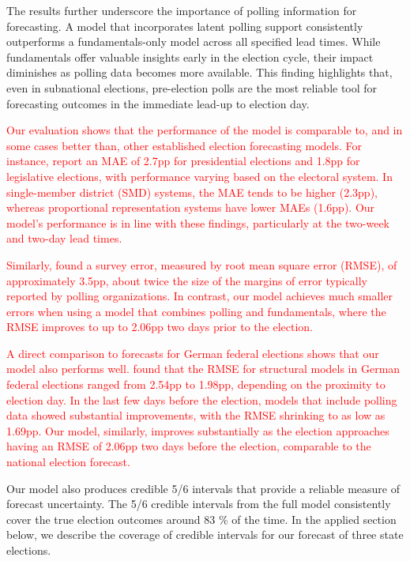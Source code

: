 \documentclass[doublespaced,12pt]{article}
\begin{document}
\begin{doublespacing}
The results further underscore the importance of polling information for forecasting. A model that incorporates latent polling support consistently outperforms a fundamentals-only model across all specified lead times. While fundamentals offer valuable insights early in the election cycle, their impact diminishes as polling data becomes more available. This finding highlights that, even in subnational elections, pre-election polls are the most reliable tool for forecasting outcomes in the immediate lead-up to election day.

\textcolor{red}{Our evaluation shows that the performance of the model is comparable to, and in some cases better than, other established election forecasting models. For instance, \citet{jennings2018election} report an MAE of 2.7pp for presidential elections and 1.8pp for legislative elections, with performance varying based on the electoral system. In single-member district (SMD) systems, the MAE tends to be higher (2.3pp), whereas proportional representation systems have lower MAEs (1.6pp). Our model's performance is in line with these findings, particularly at the two-week and two-day lead times.}

\textcolor{red}{Similarly, \citet{shirani2018disentangling} found a survey error, measured by root mean square error (RMSE), of approximately 3.5pp, about twice the size of the margins of error typically reported by polling organizations. In contrast, our model achieves much smaller errors when using a model that combines polling and fundamentals, where the RMSE improves to up to 2.06pp two days prior to the election.}

\textcolor{red}{A direct comparison to forecasts for German federal elections shows that our model also performs well. \citet{munzert_2017} found that the RMSE for structural models in German federal elections ranged from 2.54pp to 1.98pp, depending on the proximity to election day. In the last few days before the election, models that include polling data showed substantial improvements, with the RMSE shrinking to as low as 1.69pp. Our model, similarly, improves substantially as the election approaches having an RMSE of 2.06pp two days before the election, comparable to the national election forecast.}

Our model also produces credible 5/6 intervals that provide a reliable measure of forecast uncertainty. The 5/6 credible intervals from the full model consistently cover the true election outcomes around 83 \% of the time. In the applied section below, we describe the coverage of credible intervals for our forecast of three state elections.


\end{doublespacing}
\end{document}
